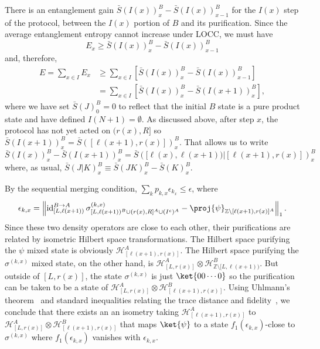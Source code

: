 \documentclass[12pt]{article}
\newcommand{\sbr}{\bar{S}}
\begin{document}
There is an entanglement gain $\bar{S}(I(x))^B_x - \bar{S}(I(x))^B_{x-1}$ for the $I(x)$ step of the protocol, between the $I(x)$ portion of $B$ and its purification. Since the average entanglement entropy cannot increase under LOCC, we must have
\begin{equation} \label{entang-gain}
E_x  \geq \bar{S}(I(x))^B_x - \bar{S}(I(x))^B_{x-1}
\end{equation}
and, therefore,
\begin{align}
E
= \sum_{x \in I} E_x
&\geq \sum_{x \in I} \left[ \bar{S}(I(x))^B_x - \bar{S}(I(x))^B_{x-1} \right] \\
&= \sum_{x \in I} \left[ \bar{S}( I(x) )^B_x - \bar{S}( I(x+1) )^B_{x} \right],
\end{align}
where we have set $\bar{S}(J)^B_0 = 0$ to reflect that the initial $B$ state is a pure product state and  have defined $I(N+1)=\emptyset$.
%
As discussed above, after step $x$, the protocol has not yet acted on $(r(x),R]$ so $\sbr ( I(x+1) )^B_x = \sbr ( [ \ell(x+1), r(x) ] )^B_x$. That allows us to write
\begin{equation}
\bar{S}( I(x) )^B_x - \bar{S}( I(x+1) )^B_{x}
= \sbr\left( [ \ell(x), \ell(x+1) ) \big| [ \ell(x+1), r(x) ] \right)^B_x
\end{equation}
where, as usual, $\sbr (J|K)^B_x \equiv \sbr (JK)^B_x - \sbr (K)^B_x$.


By the sequential merging condition, $\sum_k p_{k,x} \epsilon_{k_x} \leq \epsilon$, where
\begin{equation}
\epsilon_{k,x} = \left\|
 \operatorname{id}_{[L,\ell(x+1))}^{B \rightarrow A} \sigma^{(k,x)}_{[L,\ell(x+1))^B \cup (r(x),R]^A \cup (I^c)^A }-  \proj{\psi}_{\mathbb{Z} \setminus [\ell(x+1),r(x)]^A}
\right\|_1.
\end{equation}
Since these two density operators are close to each other, their purifications are related by isometric Hilbert space transformations.
%
The Hilbert space purifying the $\psi$ mixed state is obviously $\mathcal{H}^A_{[\ell(x+1),r(x)]}$. The Hilbert space purifying the $\sigma^{(k,x)}$ mixed state, on the other hand, is $\mathcal{H}_{[L,r(x)]}^A \otimes \mathcal{H}_{\mathbb{Z} \setminus [L,\ell(x+1))}^B$. But outside of $[L,r(x)]$, the state $\sigma^{(k,x)}$ is just $\ket{00\cdots 0}$ so the purification can be taken to be a state of $\mathcal{H}_{[L,r(x)]}^A \otimes \mathcal{H}_{[\ell(x+1),r(x)]}^B$.
%
Using Uhlmann's theorem~\cite{uhlmann1976transition} and standard inequalities relating the trace distance and fidelity~\cite{fuchs}, we conclude that there exists an an isometry taking $\mathcal{H}^A_{ [\ell(x+1),r(x)]}$ to $\mathcal{H}^A_{[L,r(x)]}  \otimes  \mathcal{H}^B_{[\ell(x+1),r(x)]}$ that maps $\ket{\psi}$ to a state $f_1(\epsilon_{k,x})$-close to $\sigma^{(k,x)}$ where $f_1(\epsilon_{k,x})$ vanishes with $\epsilon_{k,x}$.
\end{document}
